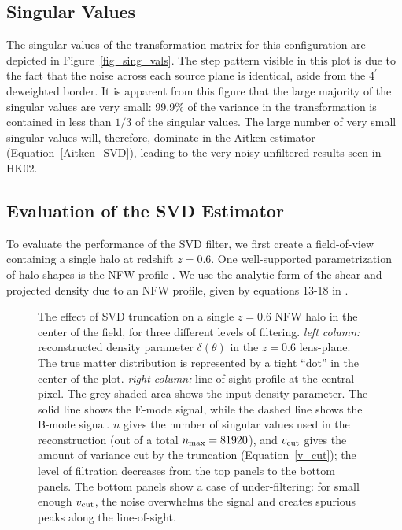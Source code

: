 \documentclass[twocolumn]{emulateapj}
\begin{document}
\subsection{Singular Values}
The singular values of the transformation matrix for this configuration 
are depicted in Figure~\ref{fig_sing_vals}.  The step pattern visible in
this plot is due to the fact that the noise across 
each source plane is identical,
aside from the $4^\prime$ deweighted border.  
It is apparent from this figure that the large
majority of the singular values are very small: 99.9\% of the variance
in the transformation is contained in less than $1/3$
of the singular values.  The large number of very small
singular values will, therefore, dominate in the Aitken estimator 
(Equation~\ref{Aitken_SVD}), leading to the very noisy unfiltered 
results seen in HK02.  

\subsection{Evaluation of the SVD Estimator}
\label{SVD_Evaluation}
To evaluate the performance of the SVD filter, we first create a
field-of-view containing a single halo at redshift $z = 0.6$.
One well-supported parametrization of halo shapes is the
NFW profile \citep{NFW97}.  We use the analytic form of the
shear and projected density due to an NFW profile, given by equations
13-18 in
\citet{Takada03}.

\begin{figure*}[p]
 \centering
 \caption{
   The effect of SVD truncation on a single $z=0.6$ NFW halo
   in the center of the field, for three different levels of filtering.
   \textit{left column:}
   reconstructed density parameter $\delta(\theta)$ in the $z=0.6$ lens-plane.
   The true matter distribution is represented by a tight ``dot'' in the 
   center of the plot.
   \textit{right column:}
   line-of-sight profile at the central pixel.  The grey shaded area 
   shows the input density parameter.  The solid line shows the E-mode signal, 
   while the dashed line shows the B-mode signal.
   $n$ gives the number of singular values
   used in the reconstruction (out of a total $n_{\rm max}=81920$), 
   and $v_{\rm cut}$ gives the amount of variance cut by the truncation 
   (Equation~\ref{v_cut}); the level of filtration decreases from the top
   panels to the bottom panels.  
   The bottom panels show a case of under-filtering:
   for small enough $v_{\rm cut}$, the noise overwhelms the signal and creates
   spurious peaks along the line-of-sight.
   \label{fig_los_plot}} 
\end{figure*}
\end{document}
